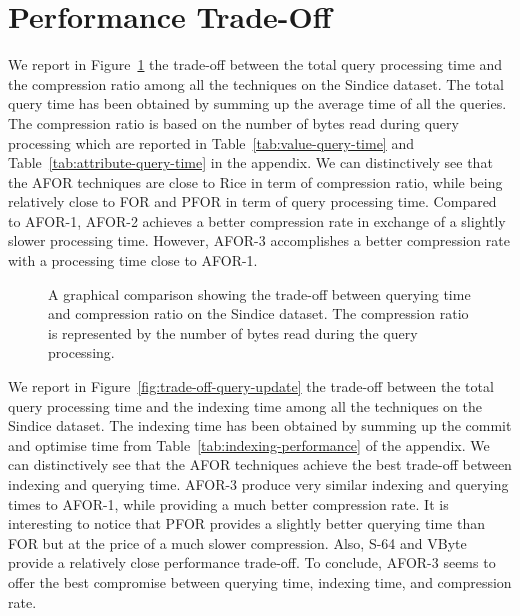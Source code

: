 \section{Performance Trade-Off}

We report in Figure~\ref{fig:trade-off-time-bytes} the trade-off between the
total query processing time and the compression ratio among all the techniques
on the Sindice dataset. The total query time has been obtained by summing up
the average time of all the queries. The compression ratio is based on the
number of bytes read during query processing which are reported in
Table~\ref{tab:value-query-time} and Table~\ref{tab:attribute-query-time} in
the appendix.
We can distinctively see that the AFOR techniques are close to Rice in term of
compression ratio, while being relatively close to FOR and PFOR in term of
query processing time. Compared to AFOR-1, AFOR-2 achieves a better
compression rate in exchange of a slightly slower processing time. However,
AFOR-3 accomplishes a better compression rate with a processing time close to
AFOR-1.

\begin{figure}
  \centering
	\caption{A graphical comparison showing the trade-off between querying time
	and compression ratio on the Sindice dataset. The compression ratio is
	represented by the number of bytes read during the query processing.}
	\label{fig:trade-off-time-bytes}
\end{figure}

We report in Figure~\ref{fig:trade-off-query-update} the trade-off between the
total query processing time and the indexing time among all the techniques on
the Sindice dataset. The indexing time has been obtained by summing up the
commit and optimise time from Table~\ref{tab:indexing-performance} of the
appendix. We can distinctively see that the AFOR techniques achieve the best
trade-off between indexing and querying time. AFOR-3 produce very similar
indexing and querying times to AFOR-1, while providing a much better
compression rate. It is interesting to notice that PFOR provides a slightly
better querying time than FOR but at the price of a much slower compression.
Also, S-64 and VByte provide a relatively close performance trade-off. To
conclude, AFOR-3 seems to offer the best compromise between querying time,
indexing time, and compression rate.

